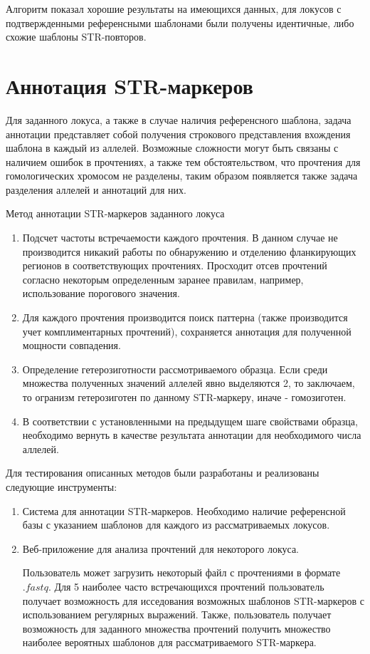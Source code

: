 Алгоритм показал хорошие результаты на имеющихся данных,
для локусов с подтвержденными референсными шаблонами были получены идентичные, либо схожие шаблоны
STR-повторов.

\section{Аннотация STR-маркеров}

Для заданного локуса, а также в случае наличия референсного шаблона, задача аннотации представляет
собой получения строкового представления вхождения шаблона в каждый из аллелей. Возможные
сложности могут быть связаны с наличием ошибок в прочтениях, а также тем обстоятельством, что прочтения
для гомологических хромосом не разделены, таким образом появляется также задача разделения аллелей
и аннотаций для них.

\Algorithm Метод аннотации STR-маркеров заданного локуса
\begin{enumerate}
  \item Подсчет частоты встречаемости каждого прочтения.
  В данном случае не производится никакий работы
  по обнаружению и отделению фланкирующих регионов в соответствующих прочтениях. Просходит отсев
  прочтений согласно некоторым определенным заранее правилам, например, использование порогового значения.

  \item Для каждого прочтения производится поиск паттерна (также производится учет комплиментарных прочтений),
  сохраняется аннотация для полученной мощности совпадения.

  \item Определение гетерозиготности рассмотриваемого образца.
  Если среди множества полученных значений аллелей явно выделяются 2, то заключаем,
  то огранизм гетерозиготен по данному STR-маркеру,
  иначе - гомозиготен.

  \item В соответствии с установленными на предыдущем шаге свойствами образца,
  необходимо вернуть в качестве результата аннотации для необходимого числа аллелей.
\end{enumerate}

Для тестирования описанных методов были разработаны и реализованы следующие инструменты:
\begin{enumerate}
  \item Система для аннотации STR-маркеров.
  Необходимо наличие референсной базы с указанием шаблонов для каждого из рассматриваемых локусов.

  \item Веб-приложение для анализа прочтений для некоторого локуса.

  Пользователь может загрузить некоторый файл с прочтениями в формате $.fastq$.
  Для 5 наиболее часто встречающихся прочтений пользователь получает возможность
  для исседования возможных шаблонов STR-маркеров с использованием регулярных выражений.
  Также, пользователь получает возможность для заданного множества прочтений получить
  множество наиболее вероятных шаблонов для рассматриваемого STR-маркера.

\end{enumerate}

